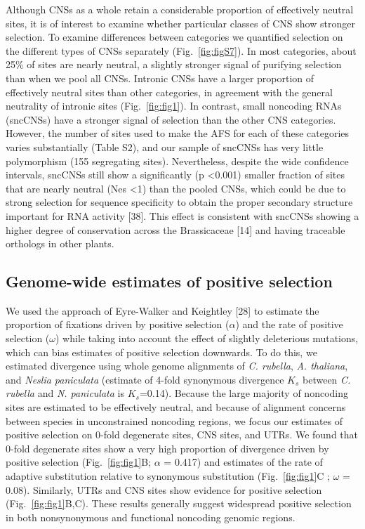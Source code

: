 Although CNSs as a whole retain a considerable proportion of effectively neutral sites, it is of interest to examine whether particular classes of CNS show stronger selection. To examine differences between categories we quantified selection on the different types of CNSs separately (Fig.~\ref{fig:figS7}). In most categories, about 25\% of sites are nearly neutral, a slightly stronger signal of purifying selection than when we pool all CNSs. Intronic CNSs have a larger proportion of effectively neutral sites than other categories, in agreement with the general neutrality of intronic sites (Fig.~\ref{fig:fig1}). In contrast, small noncoding RNAs (sncCNSs) have a stronger signal of selection than the other CNS categories. However, the number of sites used to make the AFS for each of these categories varies substantially (Table S2), and our sample of sncCNSs has very little polymorphism (155 segregating sites). Nevertheless, despite the wide confidence intervals, sncCNSs still show a significantly (p \textless 0.001) smaller fraction of sites that are nearly neutral (Nes \textless 1) than the pooled CNSs, which could be due to strong selection for sequence specificity to obtain the proper secondary structure important for RNA activity [38]. This effect is consistent with sncCNSs showing a higher degree of conservation across the Brassicaceae [14] and having traceable orthologs in other plants.


\subsection{Genome-wide estimates of positive selection} 
We used the approach of Eyre-Walker and Keightley [28] to estimate the proportion of fixations driven by positive selection ($\alpha$) and the rate of positive selection ($\omega$) while taking into account the effect of slightly deleterious mutations, which can bias estimates of positive selection downwards. To do this, we estimated divergence using whole genome alignments of \textit{C. rubella}, \textit{A. thaliana}, and \textit{Neslia paniculata} (estimate of 4-fold synonymous divergence $K_{s}$ between \textit{C. rubella} and \textit{N. paniculata} is $K_{s}$=0.14). Because the large majority of noncoding sites are estimated to be effectively neutral, and because of alignment concerns between species in unconstrained noncoding regions, we focus our estimates of positive selection on 0-fold degenerate sites, CNS sites, and UTRs. We found that 0-fold degenerate sites show a very high proportion of divergence driven by positive selection  (Fig.~\ref{fig:fig1}B; $\alpha$ = 0.417) and estimates of the rate of adaptive substitution relative to synonymous substitution (Fig.~\ref{fig:fig1}C ; $\omega$ = 0.08). Similarly, UTRs and CNS sites show evidence for positive selection (Fig.~\ref{fig:fig1}B,C). These results generally suggest widespread positive selection in both nonsynonymous and functional noncoding genomic regions.

